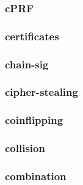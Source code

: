 \begin{frame} \frametitle{cPRF}
\begin{figure}
\begin{center}

\end{center}
\end{figure}
\end{frame}
\begin{frame} \frametitle{certificates}
\begin{figure}
\begin{center}

\end{center}
\end{figure}
\end{frame}
\begin{frame} \frametitle{chain-sig}
\begin{figure}
\begin{center}

\end{center}
\end{figure}
\end{frame}
\begin{frame} \frametitle{cipher-stealing}
\begin{figure}
\begin{center}

\end{center}
\end{figure}
\end{frame}
\begin{frame} \frametitle{coinflipping}
\begin{figure}
\begin{center}

\end{center}
\end{figure}
\end{frame}
\begin{frame} \frametitle{collision}
\begin{figure}
\begin{center}

\end{center}
\end{figure}
\end{frame}
\begin{frame} \frametitle{combination}
\begin{figure}
\begin{center}

\end{center}
\end{figure}
\end{frame}
